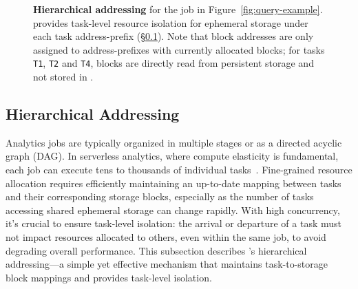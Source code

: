 \begin{figure}[t]
\begin{tikzpicture}[font=\scriptsize, yscale=0.75, task/.style={draw, circle, align=center, inner sep=2pt}, block/.style={draw, align=center, fill=gray!20, inner sep=2pt}]
  \end{tikzpicture}
  \caption[Hierarchical addressing]{\textbf{Hierarchical addressing} for the job in Figure~\ref{fig:query-example}. \jiffy provides task-level resource isolation for ephemeral storage under each task address-prefix (\S\ref{ssec:hva}). Note that block addresses are only assigned to address-prefixes with currently allocated blocks; for tasks \texttt{T1}, \texttt{T2} and \texttt{T4}, blocks are directly read from persistent storage and not stored in \jiffy.}
  \label{fig:hina}
\end{figure}

\subsection{Hierarchical Addressing}
\label{ssec:hva}
Analytics jobs are typically organized in multiple stages or as a directed acyclic graph (DAG). In serverless analytics, where compute elasticity is fundamental, each job can execute tens to thousands of individual tasks~\cite{starling, locus, pocket, flint, sparkonlambda, cirrus, excamera, pywren, numpywren, gg, athena, aurora, azuresqldw, cloudburst, snowset}. Fine-grained resource allocation requires efficiently maintaining an up-to-date mapping between tasks and their corresponding storage blocks, especially as the number of tasks accessing shared ephemeral storage can change rapidly. With high concurrency, it's crucial to ensure task-level isolation: the arrival or departure of a task must not impact resources allocated to others, even within the same job, to avoid degrading overall performance. This subsection describes \jiffy's hierarchical addressing—a simple yet effective mechanism that maintains task-to-storage block mappings and provides task-level isolation.

